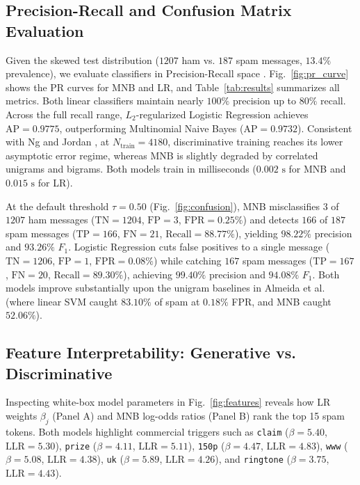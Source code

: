 \documentclass[conference]{IEEEtran}
\begin{document}
\subsection{Precision-Recall and Confusion Matrix Evaluation}
Given the skewed test distribution ($1207$ ham vs. $187$ spam messages,
$13.4\%$ prevalence), we evaluate classifiers in Precision-Recall space
\cite{10.1145/1143844.1143874}. Fig.~\ref{fig:pr_curve} shows the PR curves
for MNB and LR, and Table~\ref{tab:results} summarizes all metrics. Both
linear classifiers maintain nearly $100\%$ precision up to $80\%$ recall.
Across the full recall range, $L_2$-regularized Logistic Regression achieves
$\text{AP} = 0.9775$, outperforming Multinomial Naive Bayes
($\text{AP} = 0.9732$). Consistent with Ng and Jordan \cite{NIPS2001_7b7a53e2},
at $N_{\text{train}} = 4180$, discriminative training reaches its lower
asymptotic error regime, whereas MNB is slightly degraded by correlated
unigrams and bigrams. Both models train in milliseconds ($0.002\text{ s}$ for
MNB and $0.015\text{ s}$ for LR).

At the default threshold $\tau = 0.50$ (Fig.~\ref{fig:confusion}), MNB
misclassifies $3$ of $1207$ ham messages ($\text{TN} = 1204$, $\text{FP} = 3$,
$\text{FPR} = 0.25\%$) and detects $166$ of $187$ spam messages
($\text{TP} = 166$, $\text{FN} = 21$, $\text{Recall} = 88.77\%$), yielding
$98.22\%$ precision and $93.26\%$ $F_1$. Logistic Regression cuts false
positives to a single message ($\text{TN} = 1206$, $\text{FP} = 1$,
$\text{FPR} = 0.08\%$) while catching $167$ spam messages ($\text{TP} = 167$,
$\text{FN} = 20$, $\text{Recall} = 89.30\%$), achieving $99.40\%$ precision
and $94.08\%$ $F_1$. Both models improve substantially upon the unigram
baselines in Almeida et al. \cite{10.1145/2034691.2034742} (where linear SVM
caught $83.10\%$ of spam at $0.18\%$ FPR, and MNB caught $52.06\%$).

\subsection{Feature Interpretability: Generative vs. Discriminative}
Inspecting white-box model parameters \cite{DREISEITL2002352} in
Fig.~\ref{fig:features} reveals how LR weights $\beta_j$ (Panel A) and MNB
log-odds ratios (Panel B) rank the top 15 spam tokens. Both models highlight
commercial triggers such as \texttt{claim} ($\beta = 5.40$,
$\text{LLR} = 5.30$), \texttt{prize} ($\beta = 4.11$, $\text{LLR} = 5.11$),
\texttt{150p} ($\beta = 4.47$, $\text{LLR} = 4.83$), \texttt{www}
($\beta = 5.08$, $\text{LLR} = 4.38$), \texttt{uk} ($\beta = 5.89$,
$\text{LLR} = 4.26$), and \texttt{ringtone} ($\beta = 3.75$,
$\text{LLR} = 4.43$).
\end{document}
